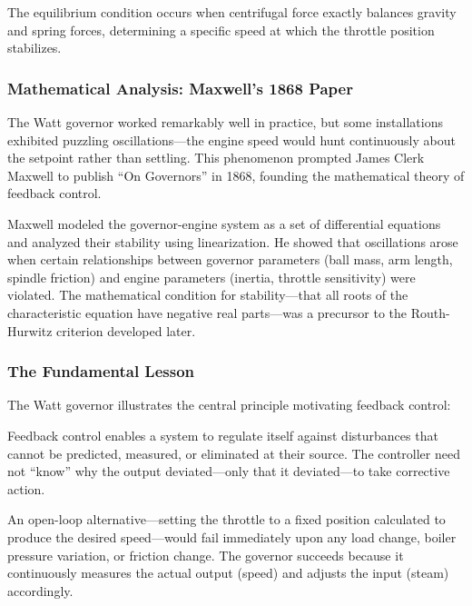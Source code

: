 The equilibrium condition occurs when centrifugal force exactly balances gravity and spring forces, determining a specific speed at which the throttle position stabilizes.

\subsubsection{Mathematical Analysis: Maxwell's 1868 Paper}

The Watt governor worked remarkably well in practice, but some installations exhibited puzzling oscillations---the engine speed would hunt continuously about the setpoint rather than settling. This phenomenon prompted James Clerk Maxwell to publish ``On Governors'' in 1868, founding the mathematical theory of feedback control.

Maxwell modeled the governor-engine system as a set of differential equations and analyzed their stability using linearization. He showed that oscillations arose when certain relationships between governor parameters (ball mass, arm length, spindle friction) and engine parameters (inertia, throttle sensitivity) were violated. The mathematical condition for stability---that all roots of the characteristic equation have negative real parts---was a precursor to the Routh-Hurwitz criterion developed later.

\subsubsection{The Fundamental Lesson}

The Watt governor illustrates the central principle motivating feedback control:

\begin{tcolorbox}[colback=blue!5!white,colframe=blue!75!black,title=The Feedback Principle,sharp corners]
Feedback control enables a system to regulate itself against disturbances that cannot be predicted, measured, or eliminated at their source. The controller need not ``know'' why the output deviated---only that it deviated---to take corrective action.
\end{tcolorbox}

An open-loop alternative---setting the throttle to a fixed position calculated to produce the desired speed---would fail immediately upon any load change, boiler pressure variation, or friction change. The governor succeeds because it continuously measures the actual output (speed) and adjusts the input (steam) accordingly.

